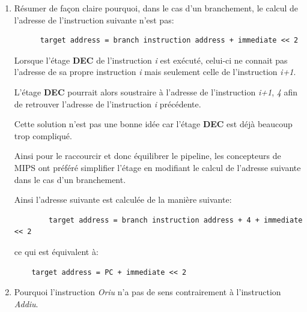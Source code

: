 \begin{enumerate}
\begin{correction}
      Puisque l'instruction \textit{Andi} est une op\'eration logique
      et non arithm\'etique, l'imm\'ediat sera consid\'er\'e comme
      un nombre non-sign\'e.

      De ce fait les 16 bits de poids forts seront tous simplement
      remplis de z\'eros et l'op\'eration pourra \^etre effectu\'ee
      correctement.

    \end{correction}
  \item
    R\'esumer de fa\c{c}on claire pourquoi, dans le cas d'un branchement,
    le calcul de l'adresse de l'instruction suivante n'est pas:

    \begin{verbatim}
      target address = branch instruction address + immediate << 2
    \end{verbatim}

    \begin{correction}

      Lorsque l'\'etage \textbf{DEC} de l'instruction \textit{i} est
      ex\'ecut\'e, celui-ci ne connait pas l'adresse de sa propre instruction
      \textit{i} mais seulement celle de l'instruction \textit{i+1}.

      L'\'etage \textbf{DEC} pourrait alors soustraire \`a l'adresse de
      l'instruction \textit{i+1}, \textit{4} afin de retrouver l'adresse
      de l'instruction \textit{i} pr\'ec\'edente.

      Cette solution n'est pas une bonne id\'ee car l'\'etage \textbf{DEC}
      est d\'ej\`a beaucoup trop compliqu\'e.

      Ainsi pour le raccourcir et donc \'equilibrer le pipeline, les
      concepteurs de MIPS ont pr\'ef\'er\'e simplifier l'\'etage en
      modifiant le calcul de l'adresse suivante dans le cas d'un branchement.

      Ainsi l'adresse suivante est calcul\'ee de la mani\`ere suivante:

      \begin{verbatim}
        target address = branch instruction address + 4 + immediate << 2
      \end{verbatim}

      ce qui est \'equivalent \`a:

      \begin{verbatim}
	target address = PC + immediate << 2
      \end{verbatim}

    \end{correction}
  \item
    Pourquoi l'instruction \textit{Oriu} n'a pas de sens contrairement
    \`a l'instruction \textit{Addiu}.


\end{enumerate}
